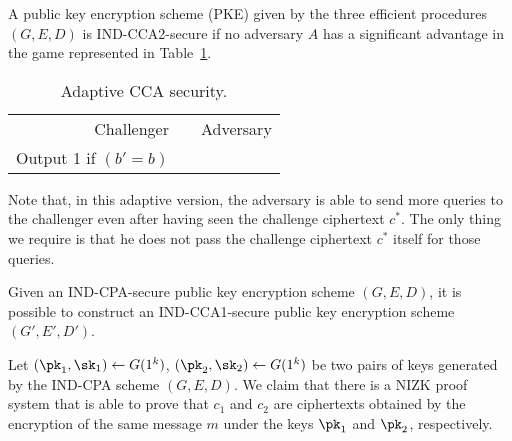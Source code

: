     \begin{definition}
        A public key encryption scheme (PKE) given by the three efficient procedures $(G,E,D)$ is
        IND-CCA2-secure if no adversary $A$ has a significant advantage in the game
        represented in Table~\ref{tab:cca2}.
        \begin{table}[t!]
            \centering
            \begin{tabular}{r c l}
                Challenger           &  & Adversary \\
                Output 1 if $(b'=b)$ &  &           \\
            \end{tabular}
            \caption{Adaptive CCA security.}\label{tab:cca2}
        \end{table}

        Note that, in this adaptive version, the adversary is able to send more queries to the
        challenger even after having seen the challenge ciphertext $c^*$. The only thing we require
        is that he does not pass the challenge ciphertext $c^*$ itself for those queries.
    \end{definition}

    \begin{theorem}
        Given an IND-CPA-secure public key encryption scheme $(G,E,D)$, it is possible
        to construct an IND-CCA1-secure public key encryption scheme $(G',E',D')$.
    \end{theorem}
    \proof
    Let $(\pk_1,\sk_1)\leftarrow G(1^k)$, $(\pk_2,\sk_2)\leftarrow G(1^k)$ be two pairs
    of keys generated by the IND-CPA scheme $(G,E,D)$.
    We claim that there is a NIZK proof system that is
    able to prove that $c_1$ and $c_2$ are ciphertexts obtained by the encryption
    of the same message $m$ under the keys $\pk_1$ and $\pk_2$, respectively.

